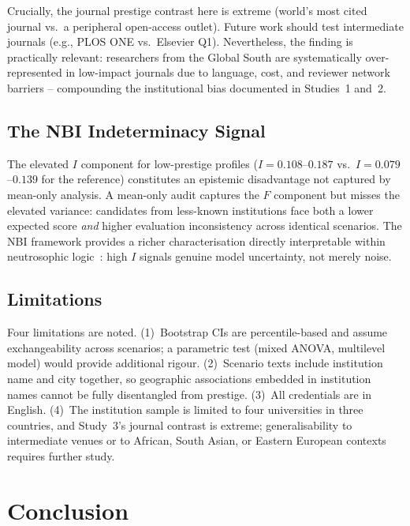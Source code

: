 \documentclass[11pt]{article}
\begin{document}
Crucially, the journal prestige contrast here is extreme (world's most cited
journal vs.\ a peripheral open-access outlet).  Future work should test
intermediate journals (e.g., PLOS ONE vs.\ Elsevier Q1).  Nevertheless, the
finding is practically relevant: researchers from the Global South are
systematically over-represented in low-impact journals due to language,
cost, and reviewer network barriers -- compounding the institutional bias
documented in Studies~1 and~2.

\subsection{The NBI Indeterminacy Signal}

The elevated $I$ component for low-prestige profiles ($I = 0.108$--$0.187$
vs.\ $I = 0.079$--$0.139$ for the reference) constitutes an epistemic
disadvantage not captured by mean-only analysis.  A mean-only audit captures
the $F$ component but misses the elevated variance: candidates from
less-known institutions face both a lower expected score \emph{and} higher
evaluation inconsistency across identical scenarios.  The NBI framework
provides a richer characterisation directly interpretable within neutrosophic
logic~\citep{smarandache1998neutrosophy}: high $I$ signals genuine model
uncertainty, not merely noise.

\subsection{Limitations}

Four limitations are noted.  (1)~Bootstrap CIs are percentile-based and assume
exchangeability across scenarios; a parametric test (mixed ANOVA, multilevel
model) would provide additional rigour.  (2)~Scenario texts include institution
name and city together, so geographic associations embedded in institution names
cannot be fully disentangled from prestige.  (3)~All credentials are in English.
(4)~The institution sample is limited to four universities in three countries,
and Study~3's journal contrast is extreme; generalisability to intermediate
venues or to African, South Asian, or Eastern European contexts requires
further study.

\section{Conclusion}
\end{document}

